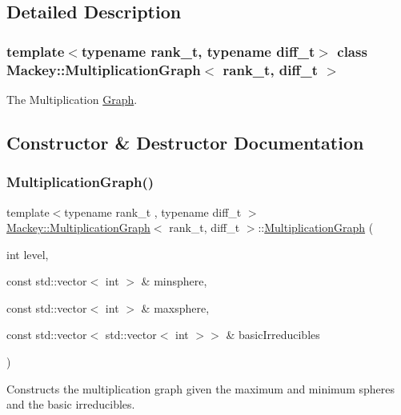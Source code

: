 \subsection{Detailed Description}
\subsubsection*{template$<$typename rank\+\_\+t, typename diff\+\_\+t$>$\newline
class Mackey\+::\+Multiplication\+Graph$<$ rank\+\_\+t, diff\+\_\+t $>$}

The Multiplication \hyperlink{classMackey_1_1Graph}{Graph}. 

\subsection{Constructor \& Destructor Documentation}
\mbox{\label{classMackey_1_1MultiplicationGraph_a3f974791242d9e13ddca520df4265aca}} 
\subsubsection{\texorpdfstring{Multiplication\+Graph()}{MultiplicationGraph()}}
{\footnotesize\ttfamily template$<$typename rank\+\_\+t , typename diff\+\_\+t $>$ \\
\hyperlink{classMackey_1_1MultiplicationGraph}{Mackey\+::\+Multiplication\+Graph}$<$ rank\+\_\+t, diff\+\_\+t $>$\+::\hyperlink{classMackey_1_1MultiplicationGraph}{Multiplication\+Graph} (\begin{DoxyParamCaption}\item[{int}]{level,  }\item[{const std\+::vector$<$ int $>$ \&}]{minsphere,  }\item[{const std\+::vector$<$ int $>$ \&}]{maxsphere,  }\item[{const std\+::vector$<$ std\+::vector$<$ int $>$$>$ \&}]{basic\+Irreducibles }\end{DoxyParamCaption})\hspace{0.3cm}{\ttfamily [protected]}}



Constructs the multiplication graph given the maximum and minimum spheres and the basic irreducibles. 

